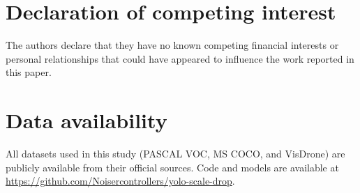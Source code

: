 \documentclass[a4paper,fleqn]{cas-dc}
\begin{document}
\printcredits

\section*{Declaration of competing interest}
The authors declare that they have no known competing financial interests or personal relationships that could have appeared to influence the work reported in this paper.

\section*{Data availability}
All datasets used in this study (PASCAL VOC, MS COCO, and VisDrone) are publicly available from their official sources. Code and models are available at \url{https://github.com/Noisercontrollers/yolo-scale-drop}.



\end{document}
